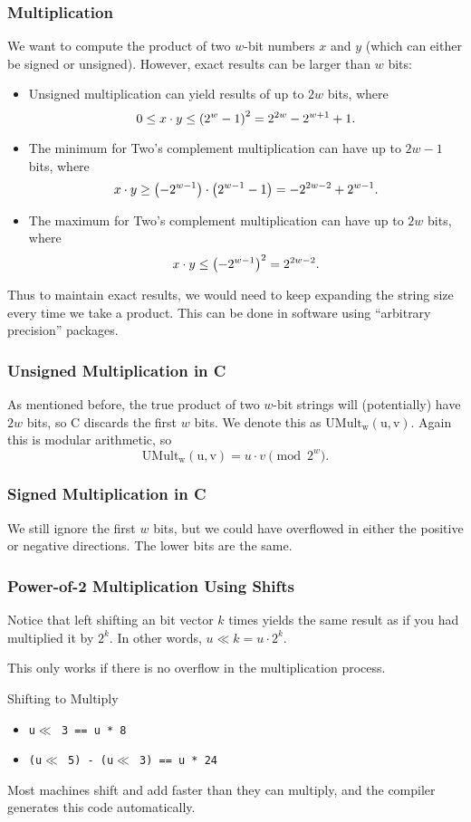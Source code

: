 \documentclass[class=article, crop=false]{standalone}
\begin{document}
  \subsubsection{Multiplication}
  We want to compute the product of two $w$-bit numbers $x$ and $y$ (which can either be signed or unsigned). However, exact results can be larger than $w$ bits:
  \begin{itemize}
    \item Unsigned multiplication can yield results of up to $2w$ bits, where
    \[
      0\leq x\cdot y\leq \left( 2^w - 1 \right)^2 = 2^{2w} - 2^{w+1} + 1.
    \]
    \item The minimum for Two's complement multiplication can have up to $2w - 1$ bits, where
    \[
      x\cdot y\geq \left( -2^{w-1} \right)\cdot \left( 2^{w-1}-1 \right) = -2^{2w - 2} + 2^{w-1}.
    \]
    \item The maximum for Two's complement multiplication can have up to $2w$ bits, where
    \[
      x\cdot y\leq \left( -2^{w-1} \right)^2 = 2^{2w - 2}.
    \]
  \end{itemize}
  Thus to maintain exact results, we would need to keep expanding the string size every time we take a product. This can be done in software using ``arbitrary precision'' packages.
  \subsubsection{Unsigned Multiplication in C}
  As mentioned before, the true product of two $w$-bit strings will (potentially) have $2w$ bits, so C discards the first $w$ bits. We denote this as $\mathrm{UMult_w(u, v)}$. Again this is modular arithmetic, so
  \[
    \mathrm{UMult_w(u, v)} = u\cdot v\pmod{2^w}.
  \]
  \subsubsection{Signed Multiplication in C}
  We still ignore the first $w$ bits, but we could have overflowed in either the positive or negative directions. The lower bits are the same. 
  \subsubsection{Power-of-2 Multiplication Using Shifts}
  Notice that left shifting an bit vector $k$ times yields the same result as if you had multiplied it by $2^k$. In other words, $u\ll k = u\cdot 2^k$.
  \begin{note}{}
    This only works if there is no overflow in the multiplication process.
  \end{note}
  \begin{example}{Shifting to Multiply}
    \begin{itemize}
      \item \texttt{u\phantom{ }$\ll$ 3 == u * 8}
      \item \texttt{(u\phantom{ }$\ll$ 5) - (u\phantom{ }$\ll$ 3) == u * 24}
    \end{itemize}
  \end{example}
  Most machines shift and add faster than they can multiply, and the compiler generates this code automatically.
\end{document}
